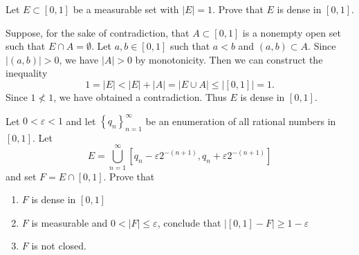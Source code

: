 \pagebreak

\begin{problem}{2}
  Let $E \subset [0,1]$ be a measurable set with $\left| E \right| = 1$. Prove that $E$ is dense in $[0,1]$.
\end{problem}



\begin{solution}
  Suppose, for the sake of contradiction, that $A \subset [0,1]$ is a nonempty open set such that $E \cap A = \emptyset$.
  Let  $a,b \in [0,1]$ such that $a < b$ and $(a,b) \subset A$.
  Since $\left| (a,b) \right| > 0$, we have $\left| A \right|>0$ by monotonicity.
  Then we can construct the inequality 
  \[
    1 = \left| E \right| < \left| E \right| + \left| A \right| = \left| E \cup A \right| \leq \left| [0,1] \right| = 1
  .\] 
  Since $1 \not< 1$, we have obtained a contradiction.
  Thus $E$ is dense in $[0,1]$.
\end{solution}

\pagebreak

\begin{problem}{3}
  Let $0 < \varepsilon < 1$ and let $\left\{ q_{n} \right\}_{n=1}^{\infty}$ be an enumeration of all rational numbers in $[0,1]$.
  Let 
  \[
    E = \bigcup_{n=1}^{\infty}\left[q_{n} - \varepsilon 2^{-(n+1)}, q_{n} + \varepsilon 2^{-(n+1)}\right]
  \] 
  and set $F = E \cap [0,1]$. Prove that
  \begin{enumerate}
    \item $F$ is dense in $[0,1]$
    \item $F$ is measurable and $0 < \left| F \right| \leq \varepsilon$, conclude that $\left| [0,1] - F \right| \geq 1 - \varepsilon$ 
    \item $F$ is not closed.
  \end{enumerate}

\end{problem}


